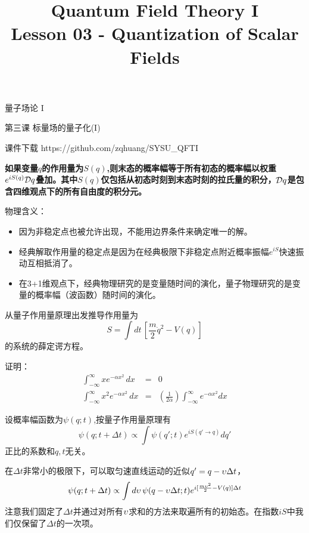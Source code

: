\documentclass[CJK]{beamer}
\title{Quantum Field Theory I \\ Lesson 03 - Quantization of Scalar Fields}
\author{}
\date{}
\begin{document}
\begin{frame}
 
\begin{center}
\begin{Large}
\bch
量子场论 I 

{\vskip 0.3in}

第三课 标量场的量子化(I)

\ech
\end{Large}
\end{center}

\vskip 0.2in

\bch
课件下载
\ech
https://github.com/zqhuang/SYSU\_QFTI

\end{frame}



\begin{frame}
\bch
{\bf 如果变量$q$的作用量为$S(q)$,则末态的概率幅等于所有初态的概率幅以权重$e^{iS(q)}\mathcal{D} q$叠加。其中$S(q)$仅包括从初态时刻到末态时刻的拉氏量的积分，$\mathcal{D} q$是包含四维观点下的所有自由度的积分元。}

\skipline
物理含义：
\begin{itemize}
\item{因为非稳定点也被允许出现，不能用边界条件来确定唯一的解。}
\item{经典解取作用量的稳定点是因为在经典极限下非稳定点附近概率振幅$e^{iS}$快速振动互相抵消了。}
\item{在3+1维观点下，经典物理研究的是变量随时间的演化，量子物理研究的是变量的概率幅（波函数）随时间的演化。}
\end{itemize}
\ech
\end{frame}


\begin{frame}
\bch
从量子作用量原理出发推导作用量为
$$S = \int dt\,  \left[\frac{m}{2}\dot q^2 - V(q)\right]$$
的系统的薛定谔方程。
\ech
\end{frame}

\begin{frame}
\bch
证明：
\begin{eqnarray}
\int_{-\infty}^{\infty} x e^{-\alpha x^2 }\, dx &=& 0 \\
\int_{-\infty}^{\infty} x^2 e^{-\alpha x^2 }\, dx &=& \left(\frac{1}{2\alpha}\right) \int_{-\infty}^{\infty} e^{-\alpha x^2} dx 
\end{eqnarray}
\ech
\end{frame}

\begin{frame}
\bch
设概率幅函数为$\psi(q;t)$,按量子作用量原理有 
$$ \psi(q; t+\Delta t) \propto \int \psi(q';t) e^{iS(q'\rightarrow q)}dq'$$
正比的系数和$q,t$无关。
\skipline

在$\Delta t$非常小的极限下，可以取匀速直线运动的近似$q' = q - \upsilon \Delta t$，
$$ \psi(q; t+\Delta t) \propto \int d\upsilon\, \psi(q-\upsilon \Delta t; t) e^{i[\frac{m\upsilon^2}{2} - V(q)]\Delta t}$$
注意我们固定了$\Delta t$并通过对所有$\upsilon$求和的方法来取遍所有的初始态。在指数$iS$中我们仅保留了$\Delta t$的一次项。
\ech
\end{frame}
\end{document}
